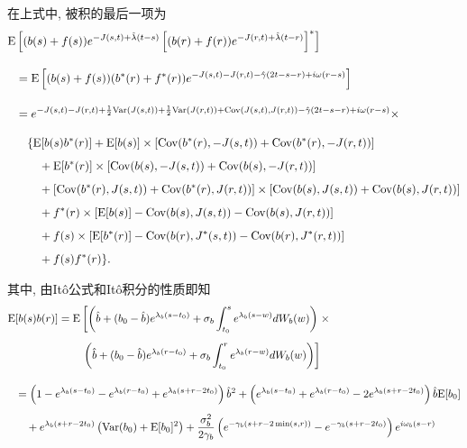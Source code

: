 \documentclass[notitlepage,cs4size,punct,oneside]{ctexrep}
\numberwithin{equation}{section}
\theoremstyle{mystyle}
\newcommand{\nq}{\\[5pt]}
\newcommand{\nw}{\\[10pt]}
\begin{document}
在上式中, 被积的最后一项为
\[
\begin{split}
\E&\left[(b(s)+f(s))e^{-J(s, t)+\hat{\lambda}(t-s)}\left[(b(r)+f(r))e^{-J(r, t)+\hat{\lambda}(t-r)}\right]^*\right] \nw
&= \E\left[(b(s)+f(s))(b^*(r)+f^*(r))e^{-J(s, t)-J(r, t)-\hat{\gamma}(2t-s-r)+i\omega(r-s)}\right] \nw
&= e^{-J(s, t)-J(r, t)+\frac{1}{2}\Var(J(s, t))+\frac{1}{2}\Var(J(r, t))+\Cov(J(s, t), J(r, t))-\hat{\gamma}(2t-s-r)+i\omega(r-s)} \times \nw
&\quad \{\E[b(s)b^*(r)]+\E[b(s)]\times[\Cov(b^*(r), -J(s, t))+\Cov(b^*(r), -J(r, t))] \nq
&\quad\quad+ \E[b^*(r)]\times[\Cov(b(s), -J(s, t))+\Cov(b(s), -J(r, t))]\nq
&\quad\quad+ [\Cov(b^*(r), J(s, t))+\Cov(b^*(r), J(r, t))]\times [\Cov(b(s), J(s, t))+\Cov(b(s), J(r, t))] \nq
&\quad\quad+ f^*(r)\times[\E[b(s)]-\Cov(b(s), J(s, t))-\Cov(b(s), J(r, t))] \nq
&\quad\quad+ f(s)\times[\E[b^*(r)]-\Cov(b(r), J^*(s, t))-\Cov(b(r), J^*(r, t))] \nq
&\quad\quad+f(s)f^*(r)\}.
\end{split}
\]

其中, 由It\^o公式和It\^o积分的性质即知
\[
\begin{split}
\E&[b(s)b(r)] = \E\left[\left(\hat{b}+(b_0-\hat{b})e^{\lambda_b(s-t_0)}+\sigma_b\int_{t_0}^s e^{\lambda_b(s-w)}dW_b(w)\right)\right.\times \nq
&\quad\quad\quad\quad\quad\quad\left.\left(\hat{b}+(b_0-\hat{b})e^{\lambda_b(r-t_0)}+\sigma_b\int_{t_0}^r e^{\lambda_b(r-w)}dW_b(w)\right) \right] \nw
&= \left(1-e^{\lambda_b(s-t_0)}-e^{\lambda_b(r-t_0)}+e^{\lambda_b(s+r-2t_0)}\right)\hat{b}^2 + \left(e^{\lambda_b(s-t_0)}+e^{\lambda_b(r-t_0)}-2e^{\lambda_b(s+r-2t_0)}\right)\hat{b}\E[b_0] \nq
&\quad + e^{\lambda_b(s+r-2t_0)}\left(\Var(b_0) + \E[b_0]^2\right) + \frac{\sigma_b^2}{2\gamma_b}\left(e^{-\gamma_b(s+r-2\min(s, r))}-e^{-\gamma_b(s+r-2t_0)}\right)e^{i\omega_b(s-r)}
\end{split}
\]
\end{document}
